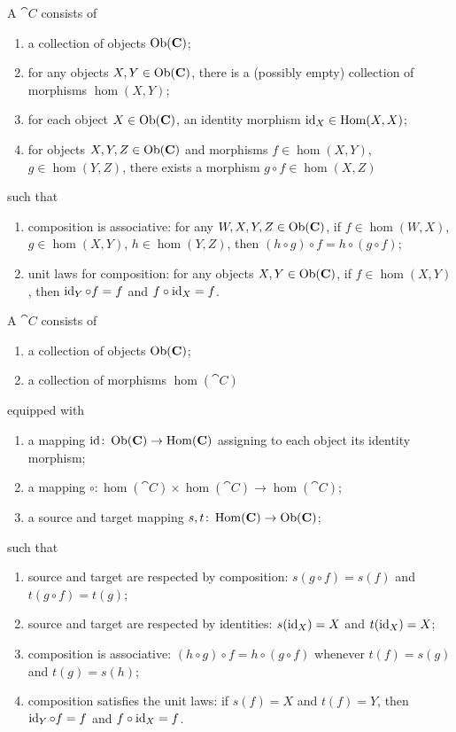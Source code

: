 \begin{node}[Category]\label{cat-0001}%
\begin{definition}[Version 1]
A  $\cat{C}$ consists of
\begin{enumerate}
\item a collection of objects $\operatorname{Ob}(\mathbf{C})$;
\item for any objects $X,Y\in\operatorname{Ob}(\mathbf{C})$, there is a (possibly empty)
  collection of morphisms $\hom(X,Y)$;
\item for each object $X\in\operatorname{Ob}(\mathbf{C})$, an identity morphism $\operatorname{id}_{X}\in\operatorname{Hom}(X,X)$;
\item for objects $X,Y,Z\in\operatorname{Ob}(\mathbf{C})$ and morphisms $f\in\hom(X,Y)$,
  $g\in\hom(Y,Z)$, there exists a morphism $g\circ f\in\hom(X,Z)$
\end{enumerate}
such that
\begin{enumerate}
\item composition is associative: for any $W,X,Y,Z\in\operatorname{Ob}(\mathbf{C})$, if
  $f\in\hom(W,X)$, $g\in\hom(X,Y)$, $h\in\hom(Y,Z)$, then $(h\circ g)\circ f=h\circ(g\circ f)$;
\item unit laws for composition: for any objects $X,Y\in\operatorname{Ob}(\mathbf{C})$,
  if $f\in\hom(X,Y)$, then $\operatorname{id}_{Y}\circ f=f$ and $f\circ\operatorname{id}_{X}=f$.
\end{enumerate}
\end{definition}

\begin{definition}[Version 2]\label{cat-0000}%
A  $\cat{C}$ consists of
\begin{enumerate}
\item a collection of objects $\operatorname{Ob}(\mathbf{C})$;
\item a collection of morphisms $\hom(\cat{C})$
\end{enumerate}
equipped with
\begin{enumerate}
\item a mapping $\operatorname{id}\colon\operatorname{Ob}(\mathbf{C})\to\operatorname{Hom}(\mathbf{C})$ assigning to
  each object its identity morphism;
\item a mapping $\circ\colon\hom(\cat{C})\times\hom(\cat{C})\to\hom(\cat{C})$;
\item a source and target mapping $s,t\colon\operatorname{Hom}(\mathbf{C})\to\operatorname{Ob}(\mathbf{C})$;
\end{enumerate}
such that
\begin{enumerate}
\item source and target are respected by composition: $s(g\circ f)=s(f)$
  and $t(g\circ f)=t(g)$;
\item source and target are respected by identities: $s(\operatorname{id}_{X})=X$ and $t(\operatorname{id}_{X})=X$;
\item composition is associative: $(h\circ g)\circ f=h\circ(g\circ f)$
  whenever $t(f)=s(g)$ and $t(g)=s(h)$;
\item composition satisfies the unit laws: if $s(f)=X$ and $t(f)=Y$,
  then $\operatorname{id}_{Y}\circ f=f$ and $f\circ\operatorname{id}_{X}=f$.
\end{enumerate}
\end{definition}


\end{node}
